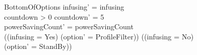 \begin{schema}{BottomOfOptions}
	infusing' = infusing\\
	countdown > 0 \land countdown' = 5\\
	powerSavingCount' = powerSavingCount\\ 
	((infusing = Yes) \land (option' = ProfileFilter)) \lor ((infusing = No)\\
	 \land (option' = StandBy))\\
\end{schema}

